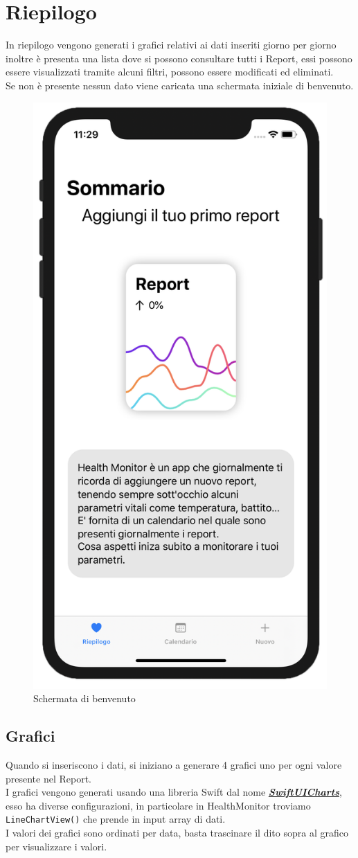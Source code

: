 \documentclass{article}
\begin{document}

\newpage
\section{Riepilogo}

In riepilogo vengono generati i grafici relativi ai dati inseriti giorno per giorno inoltre è presenta una lista dove si possono consultare tutti i Report, essi  possono essere visualizzati tramite alcuni filtri, possono essere modificati ed eliminati.\\
Se non è presente nessun dato viene caricata una schermata iniziale di benvenuto. 

\begin{figure}[htp]

\centering
\includegraphics[width=.15\textwidth]{img/riepilogo_iniziale.png}

\caption{Schermata di benvenuto}
\label{fig:figure2}
\end{figure}

\subsection{Grafici}

Quando si inseriscono i dati, si iniziano a generare 4 grafici uno per ogni valore presente nel Report.\\
I grafici vengono generati usando una libreria Swift dal nome \textbf{\textit{\href{https://github.com/AppPear/ChartView}{SwiftUICharts}}}, esso ha diverse configurazioni, in particolare in HealthMonitor troviamo \texttt{LineChartView()} che prende in input array di dati.\\
I valori dei grafici sono ordinati per data, basta trascinare il dito sopra al grafico per visualizzare i valori. 
\end{document}
